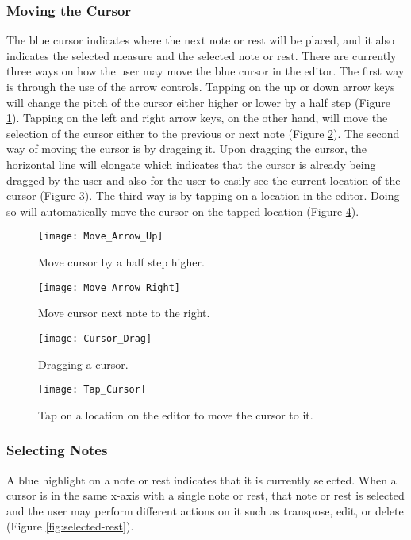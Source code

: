 \subsubsection{Moving the Cursor}
The blue cursor indicates where the next note or rest will be placed, and it also indicates the selected measure and the selected note or rest. There are currently three ways on how the user may move the blue cursor in the editor. The first way is through the use of the arrow controls. Tapping on the up or down arrow keys will change the pitch of the cursor either higher or lower by a half step (Figure \ref{fig:move-arrow-up}). Tapping on the left and right arrow keys, on the other hand, will move the selection of the cursor either to the previous or next note (Figure \ref{fig:move-arrow-right}). The second way of moving the cursor is by dragging it. Upon dragging the cursor, the horizontal line will elongate which indicates that the cursor is already being dragged by the user and also for the user to easily see the current location of the cursor (Figure \ref{fig:cursor-drag}). The third way is by tapping on a location in the editor. Doing so will automatically move the cursor on the tapped location (Figure \ref{fig:cursor-tap}).

\begin{figure}[H]
	\centering
	\texttt{[image: Move\_Arrow\_Up]}
    \caption{Move cursor by a half step higher.}
    \label{fig:move-arrow-up}
\end{figure}

\begin{figure}[H]
	\centering
	\texttt{[image: Move\_Arrow\_Right]}
    \caption{Move cursor next note to the right.}
    \label{fig:move-arrow-right}
\end{figure}

\begin{figure}[H]
	\centering
	\texttt{[image: Cursor\_Drag]}
    \caption{Dragging a cursor.}
    \label{fig:cursor-drag}
\end{figure}

\begin{figure}[H]
	\centering
	\texttt{[image: Tap\_Cursor]}
    \caption{Tap on a location on the editor to move the cursor to it.}
    \label{fig:cursor-tap}
\end{figure}

\subsubsection{Selecting Notes}
A blue highlight on a note or rest indicates that it is currently selected. When a cursor is in the same x-axis with a single note or rest, that note or rest is selected and the user may perform different actions on it such as transpose, edit, or delete (Figure \ref{fig:selected-rest}).

